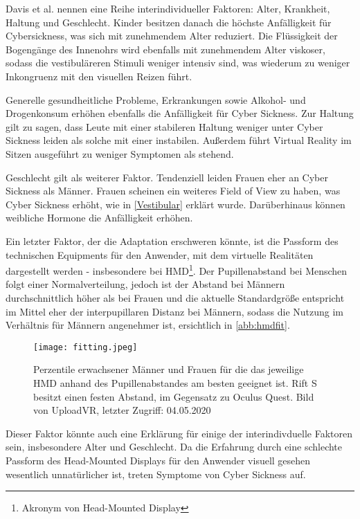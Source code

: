 Davis et al.\cite{Davis:2014:Factors} nennen eine Reihe interindividueller Faktoren: Alter, Krankheit, Haltung und Geschlecht. Kinder besitzen danach die h\"ochste Anf\"alligkeit f\"ur Cybersickness, was sich mit zunehmendem Alter reduziert. Die Fl\"ussigkeit der Bogeng\"ange des Innenohrs wird ebenfalls mit zunehmendem Alter viskoser, sodass die vestibul\"areren Stimuli weniger intensiv sind, was wiederum zu weniger Inkongruenz mit den visuellen Reizen f\"uhrt.

Generelle gesundheitliche Probleme, Erkrankungen sowie Alkohol- und Drogenkonsum\cite{Kruk:1992:Drugs} erh\"ohen ebenfalls die Anf\"alligkeit f\"ur Cyber Sickness. Zur Haltung gilt zu sagen, dass Leute mit einer stabileren Haltung weniger unter Cyber Sickness leiden als solche mit einer instabilen. Au{\ss}erdem f\"uhrt Virtual Reality im Sitzen ausgef\"uhrt zu weniger Symptomen als stehend.

Geschlecht gilt als weiterer Faktor. Tendenziell leiden Frauen eher an Cyber Sickness als M\"anner\cite{Aldaba:2019:VRNTread}. Frauen scheinen ein weiteres Field of View zu haben, was Cyber Sickness erh\"oht, wie in \autoref{Vestibular} erkl\"art wurde. Dar\"uberhinaus k\"onnen weibliche Hormone die Anf\"alligkeit erh\"ohen\cite{Kolasinski:1995:control}.


Ein letzter Faktor, der die Adaptation erschweren k\"onnte, ist die Passform des technischen Equipments f\"ur den Anwender, mit dem virtuelle Realit\"aten dargestellt werden - insbesondere bei HMD\footnote{Akronym von Head-Mounted Display}. Der Pupillenabstand bei Menschen folgt einer Normalverteilung, jedoch ist der Abstand bei M\"annern durchschnittlich h\"oher als bei Frauen und die aktuelle Standardgr\"o{\ss}e entspricht im Mittel eher der interpupillaren Distanz bei M\"annern\cite{UploadVR:2020:HMDfit}, sodass die Nutzung im Verh\"altnis f\"ur M\"annern angenehmer ist, ersichtlich in \autoref{abb:hmdfit}. 
\begin{figure}[h]
	\centering 	
	\texttt{[image: fitting.jpeg]}
	\caption{Perzentile erwachsener M\"anner und Frauen f\"ur die das jeweilige HMD anhand des Pupillenabstandes am besten geeignet ist. Rift S besitzt einen festen Abstand, im Gegensatz zu Oculus Quest. Bild von UploadVR\cite{UploadVR:2020:HMDfit}, letzter Zugriff: 04.05.2020}
	\label{abb:hmdfit}
\end{figure}


Dieser Faktor k\"onnte auch eine Erkl\"arung f\"ur einige der interindivduelle Faktoren sein, insbesondere Alter und Geschlecht. Da die Erfahrung durch eine schlechte Passform des Head-Mounted Displays f\"ur den Anwender visuell gesehen wesentlich unnat\"urlicher ist, treten Symptome von Cyber Sickness auf.





